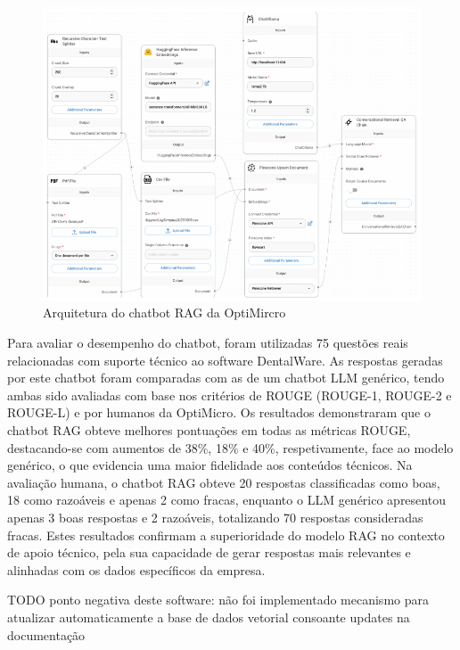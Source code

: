 \begin{figure}[H]
        \centering
        \includegraphics[width=1\linewidth]{ch3/assets/optimicro-arch.png}
        \caption{Arquitetura do chatbot RAG da OptiMircro \parencite{lee2024development}}
        \label{fig:opti-micro-arch}
\end{figure}


Para avaliar o desempenho do chatbot, foram utilizadas 75 questões reais relacionadas com suporte técnico ao software DentalWare. As respostas geradas por este chatbot foram comparadas com as de um chatbot LLM genérico, tendo ambas sido avaliadas com base nos critérios de ROUGE (ROUGE-1, ROUGE-2 e ROUGE-L) e por humanos da OptiMicro. Os resultados demonstraram que o chatbot RAG obteve melhores pontuações em todas as métricas ROUGE, destacando-se com aumentos de 38\%, 18\% e 40\%, respetivamente, face ao modelo genérico, o que evidencia uma maior fidelidade aos conteúdos técnicos. Na avaliação humana, o chatbot RAG obteve 20 respostas classificadas como boas, 18 como razoáveis e apenas 2 como fracas, enquanto o LLM genérico apresentou apenas 3 boas respostas e 2 razoáveis, totalizando 70 respostas consideradas fracas. Estes resultados confirmam a superioridade do modelo RAG no contexto de apoio técnico, pela sua capacidade de gerar respostas mais relevantes e alinhadas com os dados específicos da empresa.



TODO ponto negativa deste software: não foi implementado mecanismo para atualizar automaticamente a base de dados vetorial consoante updates na documentação


